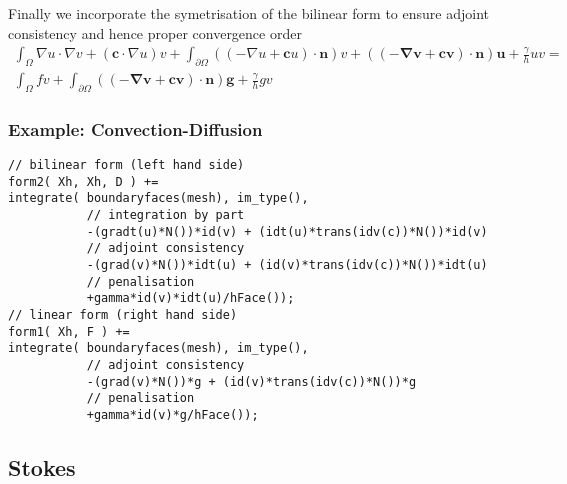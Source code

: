   Finally we incorporate the symetrisation of the bilinear form to ensure adjoint consistency and hence proper convergence order
  \begin{equation}
    \label{notes:eq:6}
    \begin{split}
      \int_\Omega \nabla u \cdot \nabla v + (\mathbf{c} \cdot \nabla u)v +
      \int_{\partial \Omega} ((-\nabla u + \mathbf{c} u)\cdot \mathbf{n}) v+ \mathbf{((-\nabla v + \mathbf{c} v)\cdot \mathbf{n}) u} + \frac{\gamma}{h} u v  = \\
      \int_\Omega f v + \int_{\partial \Omega} \mathbf{((-\nabla v + \mathbf{c} v)\cdot \mathbf{n}) g}+ \frac{\gamma}{h} g v
    \end{split}
  \end{equation}


\subsubsection[containsverbatim]{Example: Convection-Diffusion}
  \begin{lstlisting}
// bilinear form (left hand side)
form2( Xh, Xh, D ) +=
integrate( boundaryfaces(mesh), im_type(),
           // integration by part
           -(gradt(u)*N())*id(v) + (idt(u)*trans(idv(c))*N())*id(v)
           // adjoint consistency
           -(grad(v)*N())*idt(u) + (id(v)*trans(idv(c))*N())*idt(u)
           // penalisation
           +gamma*id(v)*idt(u)/hFace());
// linear form (right hand side)
form1( Xh, F ) +=
integrate( boundaryfaces(mesh), im_type(),
           // adjoint consistency
           -(grad(v)*N())*g + (id(v)*trans(idv(c))*N())*g
           // penalisation
           +gamma*id(v)*g/hFace());
  \end{lstlisting}


\subsection{Stokes}
